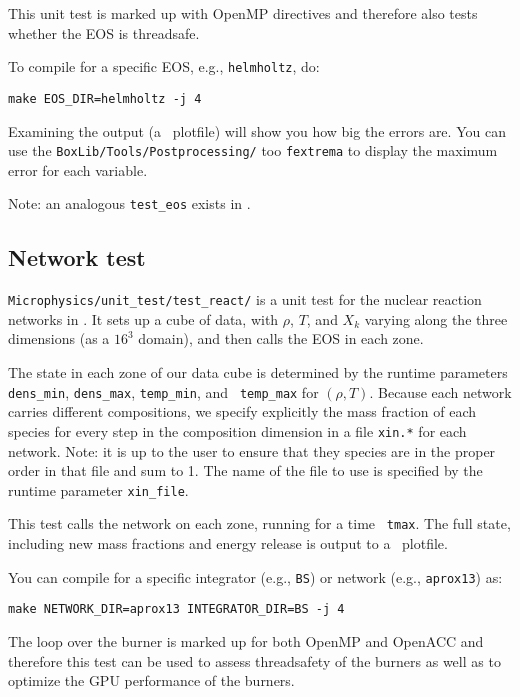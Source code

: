 This unit test is marked up with OpenMP directives and therefore also
tests whether the EOS is threadsafe.

To compile for a specific EOS, e.g., {\tt helmholtz}, do:
\begin{verbatim}
make EOS_DIR=helmholtz -j 4
\end{verbatim}

Examining the output (a \boxlib\ plotfile) will show you how big the
errors are.  You can use the {\tt BoxLib/Tools/Postprocessing/} too
{\tt fextrema} to display the maximum error for each variable.

Note: an analogous {\tt test\_eos} exists in \maestro.

\subsection{Network test}

{\tt Microphysics/unit\_test/test\_react/} is a unit test for the
nuclear reaction networks in \microphysics.  It sets up a cube of
data, with $\rho$, $T$, and $X_k$ varying along the three dimensions
(as a $16^3$ domain), and then calls the EOS in each zone.  

The state in each zone of our data cube is determined by the runtime
parameters {\tt dens\_min}, {\tt dens\_max}, {\tt temp\_min}, and {\tt
  temp\_max} for $(\rho, T)$.  Because each network carries different
compositions, we specify explicitly the mass fraction of each species
for every step in the composition dimension in a file {\tt xin.*} for
each network.  Note: it is up to the user to ensure that they species
are in the proper order in that file and sum to 1.  The name of the
file to use is specified by the runtime parameter {\tt xin\_file}.

This test calls the network on each zone, running for a time {\tt
  tmax}.  The full state, including new mass fractions and energy
release is output to a \boxlib\ plotfile.

You can compile for a specific integrator (e.g., {\tt BS}) or 
network (e.g., {\tt aprox13}) as:
\begin{verbatim}
make NETWORK_DIR=aprox13 INTEGRATOR_DIR=BS -j 4
\end{verbatim}

The loop over the burner is marked up for both OpenMP and OpenACC and
therefore this test can be used to assess threadsafety of the burners
as well as to optimize the GPU performance of the burners.



